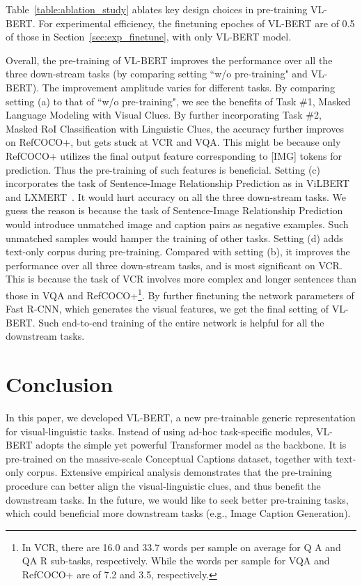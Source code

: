 \documentclass{article} \usepackage{iclr2020_conference,times}
\begin{document}
Table~\ref{table:ablation_study} ablates key design choices in pre-training VL-BERT. For experimental efficiency, the finetuning epoches of VL-BERT are of 0.5 of those in Section~\ref{sec:exp_finetune}, with only VL-BERT model.

Overall, the pre-training of VL-BERT improves the performance over all the three down-stream tasks (by comparing setting ``w/o pre-training" and  VL-BERT). The improvement amplitude varies for different tasks. By comparing setting (a) to that of ``w/o pre-training", we see the benefits of Task \#1, Masked Language Modeling with Visual Clues. By further incorporating Task \#2, Masked RoI Classification with Linguistic Clues, the accuracy further improves on RefCOCO+, but gets stuck at VCR and VQA.  This might be because only RefCOCO+ utilizes the final output feature corresponding to [IMG] tokens for prediction. Thus the pre-training of such features is beneficial. Setting (c) incorporates the task of Sentence-Image Relationship Prediction as in ViLBERT~\citep{lu2019vilbert} and LXMERT~\citep{tan2019lxmert}. It would hurt accuracy on all the three down-stream tasks. We guess the reason is because the task of Sentence-Image Relationship Prediction would introduce unmatched image and caption pairs as negative examples. Such unmatched samples would hamper the training of other tasks. Setting (d) adds text-only corpus during pre-training. Compared with setting (b), it improves the performance over all three down-stream tasks, and is most significant on VCR. This is because the task of VCR involves more complex and longer sentences than those in VQA and RefCOCO+\footnote{ In VCR, there are 16.0 and 33.7 words per sample on average for Q  A and QA  R sub-tasks, respectively. While the words per sample for VQA and RefCOCO+ are of 7.2 and 3.5, respectively.}. By further finetuning the network parameters of Fast R-CNN, which generates the visual features, we get the final setting of VL-BERT. Such end-to-end training of the entire network is helpful for all the downstream tasks.


 \section{Conclusion}

In this paper, we developed VL-BERT, a new pre-trainable generic representation for visual-linguistic tasks. Instead of using ad-hoc task-specific modules, VL-BERT adopts the simple yet powerful Transformer model as the backbone. It is pre-trained on the massive-scale Conceptual Captions dataset, together with text-only corpus. Extensive empirical analysis demonstrates that the pre-training procedure can better align the visual-linguistic clues, and thus benefit the downstream tasks. In the future, we would like to seek better pre-training tasks, which could beneficial more downstream tasks (e.g., Image Caption Generation).
 
\end{document}
